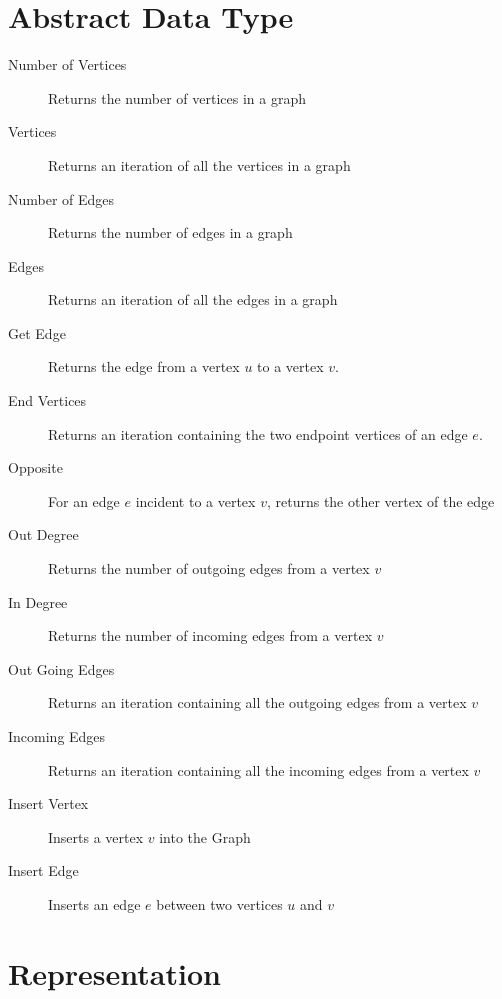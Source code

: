 \documentclass[12pt letter]{report}
\begin{document}
\section{Abstract Data Type}
\begin{description}
  \item[Number of Vertices] Returns the number of vertices in a graph
  \item[Vertices] Returns an iteration of all the vertices in a graph
  \item[Number of Edges] Returns the number of edges in a graph
  \item[Edges] Returns an iteration of all the edges in a graph
  \item[Get Edge] Returns the edge from a vertex $u$ to a vertex $v$.
  \item[End Vertices] Returns an iteration containing the two endpoint vertices of an edge $e$.
  \item[Opposite] For an edge $e$ incident to a vertex $v$, returns the other vertex of the edge
  \item[Out Degree] Returns the number of outgoing edges from a vertex $v$
  \item[In Degree] Returns the number of incoming edges from a vertex $v$
  \item[Out Going Edges] Returns an iteration containing all the outgoing edges from a vertex $v$
  \item[Incoming Edges] Returns an iteration containing all the incoming edges from a vertex $v$
  \item[Insert Vertex] Inserts a vertex $v$ into the Graph
  \item[Insert Edge] Inserts an edge $e$ between two vertices $u$ and $v$
\end{description}

\section{Representation}
\end{document}

